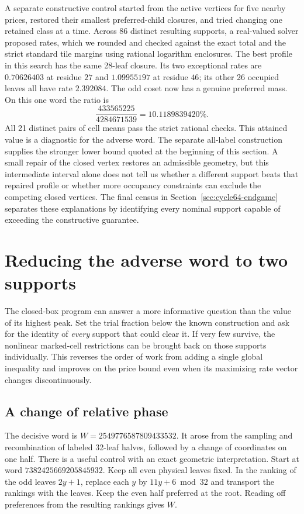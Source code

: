 \documentclass[12pt,letterpaper]{article}
\begin{document}
A separate constructive control started from the active vertices for five nearby prices, restored their smallest preferred-child closures, and tried changing one retained class at a time. Across 86 distinct resulting supports, a real-valued solver proposed rates, which we rounded and checked against the exact total and the strict standard tile margins using rational logarithm enclosures. The best profile in this search has the same 28-leaf closure. Its two exceptional rates are \(0.70626403\) at residue \(27\) and \(1.09955197\) at residue \(46\); its other 26 occupied leaves all have rate \(2.392084\). The odd coset now has a genuine preferred mass. On this one word the ratio is
\[
 \frac{433565225}{4284671539}=10.1189839420\%.
\]
All 21 distinct pairs of cell means pass the strict rational checks. This attained value is a diagnostic for the adverse word. The separate all-label construction supplies the stronger lower bound quoted at the beginning of this section. A small repair of the closed vertex restores an admissible geometry, but this intermediate interval alone does not tell us whether a different support beats that repaired profile or whether more occupancy constraints can exclude the competing closed vertices. The final census in Section~\ref{sec:cycle64-endgame} separates these explanations by identifying every nominal support capable of exceeding the constructive guarantee.
\section{Reducing the adverse word to two supports}
\label{sec:two-support-census}

The closed-box program can answer a more informative question than the value of its highest peak. Set the trial fraction below the known construction and ask for the identity of \emph{every} support that could clear it. If very few survive, the nonlinear marked-cell restrictions can be brought back on those supports individually. This reverses the order of work from adding a single global inequality and improves on the price bound even when its maximizing rate vector changes discontinuously.

\subsection{A change of relative phase}

The decisive word is \(W=2549776587809433532\). It arose from the sampling and recombination of labeled 32-leaf halves, followed by a change of coordinates on one half. There is a useful control with an exact geometric interpretation. Start at word \(7382425669205845932\). Keep all even physical leaves fixed. In the ranking of the odd leaves \(2y+1\), replace each \(y\) by \(11y+6\bmod 32\) and transport the rankings with the leaves. Keep the even half preferred at the root. Reading off preferences from the resulting rankings gives \(W\).
\end{document}

